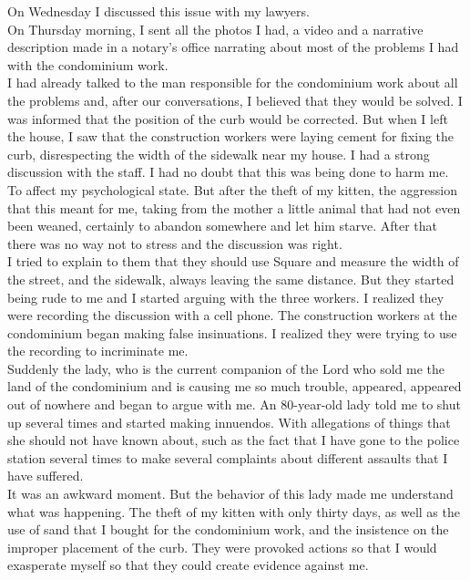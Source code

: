 \documentclass[11pt]{book}
\begin{document}
\noindent On Wednesday I discussed this issue with my lawyers. \\

\noindent On Thursday morning, I sent all the photos I had, a video and a narrative description made in a notary's office narrating about most of the problems I had with the condominium work. \\

\noindent I had already talked to the man responsible for the condominium work about all the problems and, after our conversations, I believed that they would be solved. I was informed that the position of the curb would be corrected. But when I left the house, I saw that the construction workers were laying cement for fixing the curb, disrespecting the width of the sidewalk near my house. I had a strong discussion with the staff. I had no doubt that this was being done to harm me. To affect my psychological state. But after the theft of my kitten, the aggression that this meant for me, taking from the mother a little animal that had not even been weaned, certainly to abandon somewhere and let him starve. After that there was no way not to stress and the discussion was right. \\

\noindent I tried to explain to them that they should use Square and measure the width of the street, and the sidewalk, always leaving the same distance. But they started being rude to me and I started arguing with the three workers. I realized they were recording the discussion with a cell phone. The construction workers at the condominium began making false insinuations. I realized they were trying to use the recording to incriminate me. \\

\noindent Suddenly the lady, who is the current companion of the Lord who sold me the land of the condominium and is causing me so much trouble, appeared, appeared out of nowhere and began to argue with me. An 80-year-old lady told me to shut up several times and started making innuendos. With allegations of things that she should not have known about, such as the fact that I have gone to the police station several times to make several complaints about different assaults that I have suffered. \\

\noindent It was an awkward moment. But the behavior of this lady made me understand what was happening. The theft of my kitten with only thirty days, as well as the use of sand that I bought for the condominium work, and the insistence on the improper placement of the curb. They were provoked actions so that I would exasperate myself so that they could create evidence against me. \\
\end{document}
